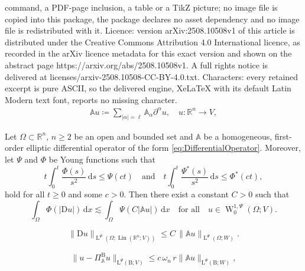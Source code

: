 \documentclass[10pt,a4paper]{amsart}
\DeclareMathOperator{\Lin}{Lin}
\newcommand{\Aop}{\mathbb{A}}
\newcommand{\D}{\mathrm{D}}
\newcommand{\R}{\mathbb R}
\newcommand{\abs}[1]{\left\lvert#1\right\rvert}
\newcommand{\ball}{\mathrm{B}}
\newcommand{\dx}[1]{\,\mathrm{d}#1}
\newcommand{\lebe}{\operatorname{L}}
\newcommand{\sobo}{\operatorname{W}}
\renewcommand{\L}{\mathrm{L}}
\begin{document}
command, a PDF-page inclusion, a table or a TikZ picture; no image file is copied into this package, the package declares no asset dependency and no image file is redistributed with it. Licence: version arXiv:2508.10508v1 of this article is distributed under the Creative Commons Attribution 4.0 International licence, as recorded in the arXiv licence metadata for this exact version and shown on the abstract page https://arxiv.org/abs/2508.10508v1. A full rights notice is delivered at licenses/arxiv-2508.10508-CC-BY-4.0.txt. Characters: every retained excerpt is pure ASCII, so the delivered engine, XeLaTeX with its default Latin Modern text font, reports no missing character.
\begin{align}\label{eq:DifferentialOperator}
\Aop u\coloneqq \sum_{\abs{\alpha}=\ell}\Aop_{\alpha}\partial^\alpha u, \quad u\colon\R^n\to V,
\end{align}

\begin{thm}
	Let $\Omega\subset\R^n$, $n\geq 2$ be an open and bounded set and $\Aop$ be a homogeneous, first-order elliptic differential operator of the form \eqref{eq:DifferentialOperator}. Moreover, let $\Psi$ and $\Phi$ be Young functions such that 
	\begin{equation}\label{eq:CianchiAssumptionYoungFunctions}
		t \int_0^t \frac{\Phi(s)}{s^2}\dx{s} \leq \Psi(ct) \quad\mbox{and}\quad t\int_0^t \frac{\Psi^\ast(s)}{s^2}\dx{s}\leq \Phi^\ast(ct),
	\end{equation}
	hold for all $t\geq 0$ and some $c>0$. Then there exist a constant $C>0$ such that 
	\begin{equation}\label{eq:Korn_Type_Orlicz_Paul}
		\int_\Omega \Phi(\abs{\D u})\dx{x} \lesssim \int_\Omega \Psi(C\abs{\Aop u})\dx{x}\quad\mbox{for all}\quad u\in \sobo^{1,\Psi}_0(\Omega;V).
	\end{equation}
\end{thm}

\begin{equation}\label{eq:Korn_Type_Orlicz_Paul_Norm}
	\|\D u \|_{\lebe^\Phi(\Omega;\Lin(\R^n;V))} \leq C\, \|\Aop u\|_{\lebe^\Psi(\Omega;W)}.
\end{equation}

	\begin{align}\label{eq:Poincare_Projection}
		\|u-\Pi^\ball_{\Aop} u\|_{\L^\Psi(\ball;V)} \leq c\, \omega_n\, r \|\Aop u\|_{\L^\Psi(\ball;W)}, 
	\end{align}
\end{document}
